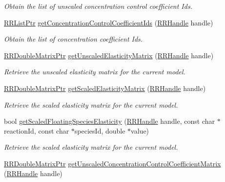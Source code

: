 \begin{DoxyCompactItemize}
\begin{DoxyCompactList}\small\item\em Obtain the list of unscaled concentration control coefficient Ids. \end{DoxyCompactList}\item 
\hyperlink{rrc__types_8h_a32a8a60ac06858ff3a791672bd2bec73}{R\+R\+List\+Ptr} \hyperlink{group__mca_ga650eb79cd39ede099c416607706b9608}{get\+Concentration\+Control\+Coefficient\+Ids} (\hyperlink{rrc__types_8h_a1d68f0592372208fa5a5f2799ea4b3ae}{R\+R\+Handle} handle)
\begin{DoxyCompactList}\small\item\em Obtain the list of concentration coefficient Ids. \end{DoxyCompactList}\item 
\hyperlink{rrc__types_8h_ae586a879d30f0823087e42d93464b5dd}{R\+R\+Double\+Matrix\+Ptr} \hyperlink{group__mca_ga14c1f732f8988b2956f096de2fe284f6}{get\+Unscaled\+Elasticity\+Matrix} (\hyperlink{rrc__types_8h_a1d68f0592372208fa5a5f2799ea4b3ae}{R\+R\+Handle} handle)
\begin{DoxyCompactList}\small\item\em Retrieve the unscaled elasticity matrix for the current model. \end{DoxyCompactList}\item 
\hyperlink{rrc__types_8h_ae586a879d30f0823087e42d93464b5dd}{R\+R\+Double\+Matrix\+Ptr} \hyperlink{group__mca_ga4f2788a77a8c7549cb8e45b1c5a89bc7}{get\+Scaled\+Elasticity\+Matrix} (\hyperlink{rrc__types_8h_a1d68f0592372208fa5a5f2799ea4b3ae}{R\+R\+Handle} handle)
\begin{DoxyCompactList}\small\item\em Retrieve the scaled elasticity matrix for the current model. \end{DoxyCompactList}\item 
bool \hyperlink{group__mca_ga2bb4853eff9e824836b776cf67ba63b0}{get\+Scaled\+Floating\+Species\+Elasticity} (\hyperlink{rrc__types_8h_a1d68f0592372208fa5a5f2799ea4b3ae}{R\+R\+Handle} handle, const char $\ast$reaction\+Id, const char $\ast$species\+Id, double $\ast$value)
\begin{DoxyCompactList}\small\item\em Retrieve the scaled elasticity matrix for the current model. \end{DoxyCompactList}\item 
\hyperlink{rrc__types_8h_ae586a879d30f0823087e42d93464b5dd}{R\+R\+Double\+Matrix\+Ptr} \hyperlink{group__mca_gacb5aba2a12248da9b2d55624687a7ace}{get\+Unscaled\+Concentration\+Control\+Coefficient\+Matrix} (\hyperlink{rrc__types_8h_a1d68f0592372208fa5a5f2799ea4b3ae}{R\+R\+Handle} handle)

\end{DoxyCompactItemize}
